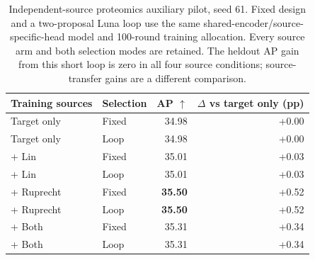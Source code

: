 \begin{table}[htbp]
\caption{Independent-source proteomics auxiliary pilot, seed 61. Fixed design and a two-proposal Luna loop use the same shared-encoder/source-specific-head model and 100-round training allocation. Every source arm and both selection modes are retained. The heldout AP gain from this short loop is zero in all four source conditions; source-transfer gains are a different comparison.}
\label{tab:completed-protein-loop}
\centering\small
\setlength{\tabcolsep}{4pt}
\begin{tabularx}{\linewidth}{@{}Xlrr@{}}
\toprule
Training sources & Selection & AP $\uparrow$ & $\Delta$ vs target only (pp) \\
\midrule
Target only & Fixed & 34.98 & +0.00 \\
Target only & Loop & 34.98 & +0.00 \\
+ Lin & Fixed & 35.01 & +0.03 \\
+ Lin & Loop & 35.01 & +0.03 \\
+ Ruprecht & Fixed & \textbf{35.50} & +0.52 \\
+ Ruprecht & Loop & \textbf{35.50} & +0.52 \\
+ Both & Fixed & 35.31 & +0.34 \\
+ Both & Loop & 35.31 & +0.34 \\
\bottomrule
\end{tabularx}
\end{table}
